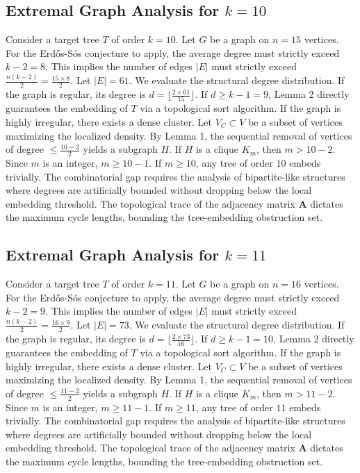 \documentclass[11pt,a4paper]{article}
\begin{document}
\subsection{Extremal Graph Analysis for $k=10$}
Consider a target tree $T$ of order $k=10$.
Let $G$ be a graph on $n=15$ vertices.
For the Erd\H{o}s-S\'os conjecture to apply, the average degree must strictly exceed $k-2 = 8$.
This implies the number of edges $|E|$ must strictly exceed $\frac{n(k-2)}{2} = \frac{15 \times 8}{2}$.
Let $|E| = 61$.
We evaluate the structural degree distribution. If the graph is regular, its degree is $d = \lfloor \frac{2 \times 61}{15} \rfloor$.
If $d \geq k-1 = 9$, Lemma 2 directly guarantees the embedding of $T$ via a topological sort algorithm.
If the graph is highly irregular, there exists a dense cluster. Let $V_C \subset V$ be a subset of vertices maximizing the localized density.
By Lemma 1, the sequential removal of vertices of degree $\leq \frac{10-2}{2}$ yields a subgraph $H$.
If $H$ is a clique $K_{m}$, then $m > 10-2$. Since $m$ is an integer, $m \geq 10-1$. If $m \geq 10$, any tree of order $10$ embeds trivially.
The combinatorial gap requires the analysis of bipartite-like structures where degrees are artificially bounded without dropping below the local embedding threshold. The topological trace of the adjacency matrix $\mathbf{A}$ dictates the maximum cycle lengths, bounding the tree-embedding obstruction set.


\subsection{Extremal Graph Analysis for $k=11$}
Consider a target tree $T$ of order $k=11$.
Let $G$ be a graph on $n=16$ vertices.
For the Erd\H{o}s-S\'os conjecture to apply, the average degree must strictly exceed $k-2 = 9$.
This implies the number of edges $|E|$ must strictly exceed $\frac{n(k-2)}{2} = \frac{16 \times 9}{2}$.
Let $|E| = 73$.
We evaluate the structural degree distribution. If the graph is regular, its degree is $d = \lfloor \frac{2 \times 73}{16} \rfloor$.
If $d \geq k-1 = 10$, Lemma 2 directly guarantees the embedding of $T$ via a topological sort algorithm.
If the graph is highly irregular, there exists a dense cluster. Let $V_C \subset V$ be a subset of vertices maximizing the localized density.
By Lemma 1, the sequential removal of vertices of degree $\leq \frac{11-2}{2}$ yields a subgraph $H$.
If $H$ is a clique $K_{m}$, then $m > 11-2$. Since $m$ is an integer, $m \geq 11-1$. If $m \geq 11$, any tree of order $11$ embeds trivially.
The combinatorial gap requires the analysis of bipartite-like structures where degrees are artificially bounded without dropping below the local embedding threshold. The topological trace of the adjacency matrix $\mathbf{A}$ dictates the maximum cycle lengths, bounding the tree-embedding obstruction set.
\end{document}
